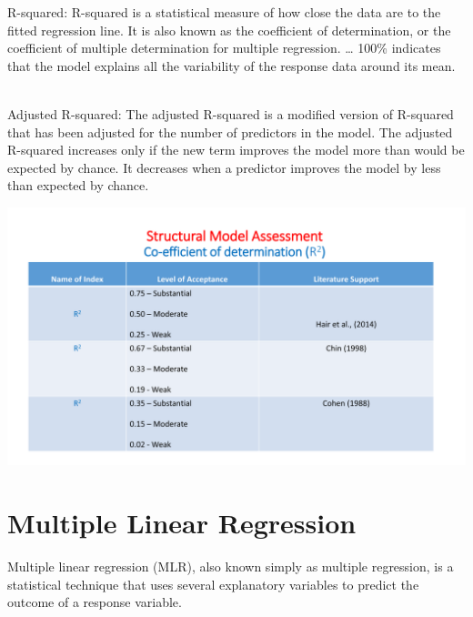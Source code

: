 \documentclass[
  letterpaper,
  DIV=11,
  numbers=noendperiod]{scrreprt}
\begin{document}
\begin{tcolorbox}[enhanced jigsaw, rightrule=.15mm, arc=.35mm, colframe=quarto-callout-note-color-frame, coltitle=black, left=2mm, colbacktitle=quarto-callout-note-color!10!white, bottomtitle=1mm, titlerule=0mm, colback=white, breakable, opacitybacktitle=0.6, opacityback=0, toprule=.15mm, toptitle=1mm, title=\textcolor{quarto-callout-note-color}{\faInfo}\hspace{0.5em}{R-Squired \& Adjusted R-Squired}, bottomrule=.15mm, leftrule=.75mm]

{R-squared:} {R-squared is a statistical measure of how close the data
are to the fitted regression line. It is also known as the coefficient
of determination, or the coefficient of multiple determination for
multiple regression. \ldots{} 100\% indicates that the model explains
all the variability of the response data around its mean.}\\
\strut \\
{Adjusted R-squared:} {The adjusted R-squared is a modified version of
R-squared that has been adjusted for the number of predictors in the
model. The adjusted R-squared increases only if the new term improves
the model more than would be expected by chance. It decreases when a
predictor improves the model by less than expected by chance.}

\end{tcolorbox}

\includegraphics{images/slides/img_Page_147.png}

\section{Multiple Linear Regression}\label{multiple-linear-regression}

Multiple linear regression (MLR), also known simply as multiple
regression, is a statistical technique that uses several explanatory
variables to predict the outcome of a response variable.\\
\end{document}
